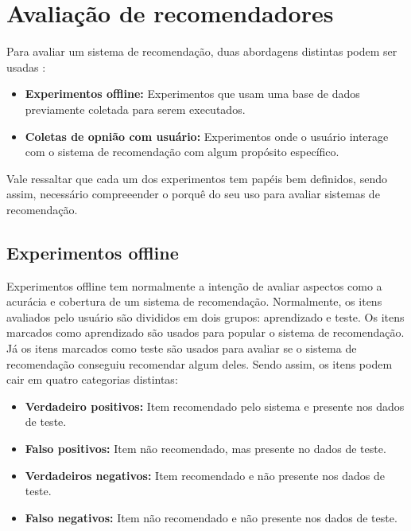 \section{Avaliação de recomendadores}

Para avaliar um sistema de recomendação, duas abordagens distintas podem ser
usadas \cite{herlocker2004evaluating}:

\begin{itemize}
    \item \textbf{Experimentos offline: } Experimentos que usam uma base de
        dados previamente coletada para serem executados.
    \item \textbf{Coletas de opnião com usuário: } Experimentos onde o usuário
        interage com o sistema de recomendação com algum propósito específico.
\end{itemize}

Vale ressaltar que cada um dos experimentos tem papéis bem definidos, sendo
assim, necessário compreeender o porquê do seu uso para avaliar sistemas de
recomendação.

\subsection{Experimentos offline} \label{sec:rec_experimentos_offline}

Experimentos offline tem normalmente a intenção de avaliar aspectos como a
acurácia e cobertura de um sistema de recomendação. Normalmente, os itens
avaliados pelo usuário são divididos em dois grupos: aprendizado e teste. Os
itens marcados como aprendizado são usados para popular o sistema de
recomendação. Já os itens marcados como teste são usados para avaliar se o
sistema de recomendação conseguiu recomendar algum deles. Sendo assim, os itens
podem cair em quatro categorias distintas:

\begin{itemize}
    \item \textbf{Verdadeiro positivos: } Item recomendado pelo sistema e
        presente nos dados de teste.
    \item \textbf{Falso positivos: } Item não recomendado, mas presente no dados
        de teste.
    \item \textbf{Verdadeiros negativos: } Item recomendado e não presente
        nos dados de teste.
    \item \textbf{Falso negativos: } Item não recomendado e não presente nos
        dados de teste.
\end{itemize}


